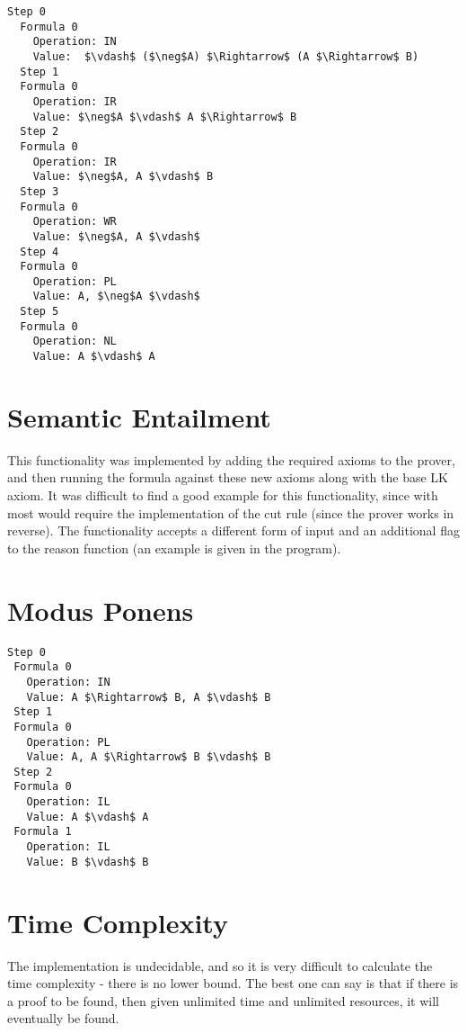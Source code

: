 \documentclass{article}
\begin{document}
\begin{lstlisting}[mathescape=true,title=Axiom 5i Proof]
  Step 0
  Formula 0
    Operation: IN
    Value:  $\vdash$ ($\neg$A) $\Rightarrow$ (A $\Rightarrow$ B)
  Step 1
  Formula 0
    Operation: IR
    Value: $\neg$A $\vdash$ A $\Rightarrow$ B
  Step 2
  Formula 0
    Operation: IR
    Value: $\neg$A, A $\vdash$ B
  Step 3
  Formula 0
    Operation: WR
    Value: $\neg$A, A $\vdash$ 
  Step 4
  Formula 0
    Operation: PL
    Value: A, $\neg$A $\vdash$ 
  Step 5
  Formula 0
    Operation: NL
    Value: A $\vdash$ A
\end{lstlisting}


\section{Semantic Entailment}

This functionality was implemented by adding the required axioms to the prover,
and then running the formula against these new axioms along with the base LK
axiom. It was difficult to find a good example for this functionality, since
with most would require the implementation of the cut rule (since the prover
works in reverse). The functionality accepts a different form of input and an
additional flag to the reason function (an example is given in the program).

\section{Modus Ponens}

\begin{lstlisting}[mathescape=true,title=Modus Ponens Proof]
 Step 0
 Formula 0
   Operation: IN
   Value: A $\Rightarrow$ B, A $\vdash$ B
 Step 1
 Formula 0
   Operation: PL
   Value: A, A $\Rightarrow$ B $\vdash$ B
 Step 2
 Formula 0
   Operation: IL
   Value: A $\vdash$ A
 Formula 1
   Operation: IL
   Value: B $\vdash$ B
\end{lstlisting}

\section{Time Complexity}

The implementation is undecidable, and so it is very difficult to calculate the
time complexity - there is no lower bound. The best one
can say is that if there is a proof to be found, then given unlimited time and
unlimited resources, it will eventually be found.
\end{document}
